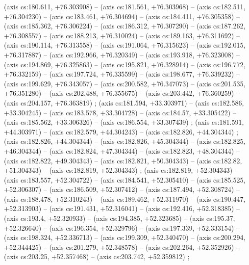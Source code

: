     (axis cs:180.611,    +76.303908) --  (axis cs:181.561,    +76.303968) --  (axis cs:182.511,    +76.304230) --  (axis cs:183.461,    +76.304694) --  (axis cs:184.411,    +76.305358) --  (axis cs:185.362,    +76.306224) --  (axis cs:186.312,    +76.307290) --  (axis cs:187.262,    +76.308557) --  (axis cs:188.213,    +76.310024) --  (axis cs:189.163,    +76.311692) --  (axis cs:190.114,    +76.313558) --  (axis cs:191.064,    +76.315623) --  (axis cs:192.015,    +76.317887) --  (axis cs:192.966,    +76.320349) --  (axis cs:193.918,    +76.323008) --  (axis cs:194.869,    +76.325863) --  (axis cs:195.821,    +76.328914) --  (axis cs:196.772,    +76.332159) --  (axis cs:197.724,    +76.335599) --  (axis cs:198.677,    +76.339232) --  (axis cs:199.629,    +76.343057) --  (axis cs:200.582,    +76.347073) --  (axis cs:201.535,    +76.351280) --  (axis cs:202.488,    +76.355675) --  (axis cs:203.442,    +76.360259) --  (axis cs:204.157,    +76.363819) ;
    (axis cs:181.594,    +33.303971) --  (axis cs:182.586,    +33.304245) --  (axis cs:183.578,    +33.304728) --  (axis cs:184.57,    +33.305422) --  (axis cs:185.562,    +33.306326) --  (axis cs:186.554,    +33.307439) ;
    (axis cs:181.591,    +44.303971) --  (axis cs:182.579,    +44.304243) --  (axis cs:182.826,    +44.304344) ;
    (axis cs:182.826,    +44.304344) --  (axis cs:182.826,    +45.304344) --  (axis cs:182.825,    +46.304344) --  (axis cs:182.824,    +47.304344) --  (axis cs:182.823,    +48.304344) --  (axis cs:182.822,    +49.304343) --  (axis cs:182.821,    +50.304343) --  (axis cs:182.82,    +51.304343) --  (axis cs:182.819,    +52.304343) ;
    (axis cs:182.819,    +52.304343) --  (axis cs:183.557,    +52.304722) --  (axis cs:184.541,    +52.305410) --  (axis cs:185.525,    +52.306307) --  (axis cs:186.509,    +52.307412) --  (axis cs:187.494,    +52.308724) --  (axis cs:188.478,    +52.310243) --  (axis cs:189.462,    +52.311970) --  (axis cs:190.447,    +52.313903) --  (axis cs:191.431,    +52.316041) --  (axis cs:192.416,    +52.318385) --  (axis cs:193.4,    +52.320933) --  (axis cs:194.385,    +52.323685) --  (axis cs:195.37,    +52.326640) --  (axis cs:196.354,    +52.329796) --  (axis cs:197.339,    +52.333154) --  (axis cs:198.324,    +52.336713) --  (axis cs:199.309,    +52.340470) --  (axis cs:200.294,    +52.344425) --  (axis cs:201.279,    +52.348578) --  (axis cs:202.264,    +52.352926) --  (axis cs:203.25,    +52.357468) --  (axis cs:203.742,    +52.359812) ;
